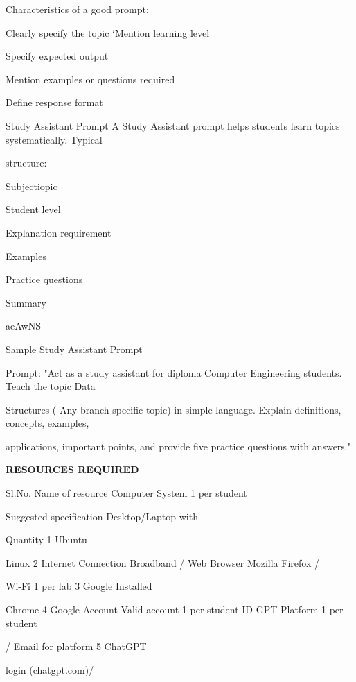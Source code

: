 \documentclass[10pt,a4paper]{article}
\begin{document}
\noindent Characteristics of a good prompt:\par
\noindent Clearly specify the topic ‘Mention learning level\par
\noindent Specify expected output\par
\noindent Mention examples or questions required\par
\noindent Define response format\par
\noindent Study Assistant Prompt A Study Assistant prompt helps students learn topics systematically. Typical\par
\noindent structure:\par
\noindent Subjectiopic\par
\noindent Student level\par
\noindent Explanation requirement\par
\noindent Examples\par
\noindent Practice questions\par
\noindent Summary\par
\noindent aeAwNS\par

\noindent Sample Study Assistant Prompt\par
\noindent Prompt: "Act as a study assistant for diploma Computer Engineering students. Teach the topic Data\par
\noindent Structures ( Any branch specific topic) in simple language. Explain definitions, concepts, examples,\par
\noindent applications, important points, and provide five practice questions with answers."\par

\medskip\noindent\textbf{RESOURCES REQUIRED}\par
\noindent Sl.No.                      Name of resource            Computer System            1 per student\par
\noindent Suggested specification     Desktop/Laptop with\par
\noindent Quantity 1                  Ubuntu\par

\noindent Linux 2                                Internet Connection Broadband /     Web Browser Mozilla Firefox /\par
\noindent Wi-Fi 1 per lab 3                   Google Installed\par

\noindent Chrome 4           Google Account      Valid account    1 per student ID   GPT Platform     1 per student\par
\noindent / Email             for platform     5                  ChatGPT\par
\noindent login                               (chatgpt.com)/\par
\end{document}
